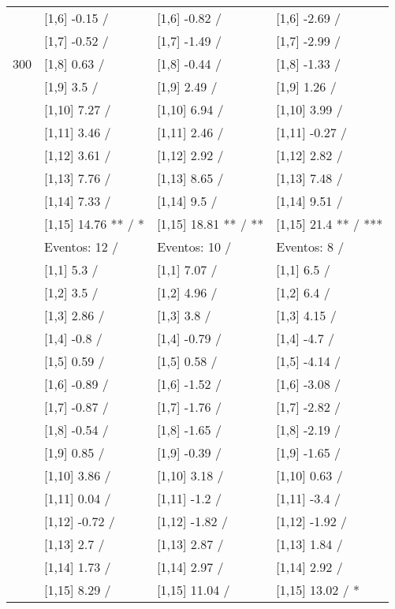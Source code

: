 \begin{table}
\begin{tabular}[t]{llll}
 & {}[1,6] -0.15  / & {}[1,6] -0.82  / & {}[1,6] -2.69  /\\
 & {}[1,7] -0.52  / & {}[1,7] -1.49  / & {}[1,7] -2.99  /\\
300 & {}[1,8] 0.63  / & {}[1,8] -0.44  / & {}[1,8] -1.33  /\\
\addlinespace
 & {}[1,9] 3.5  / & {}[1,9] 2.49  / & {}[1,9] 1.26  /\\
 & {}[1,10] 7.27  / & {}[1,10] 6.94  / & {}[1,10] 3.99  /\\
 & {}[1,11] 3.46  / & {}[1,11] 2.46  / & {}[1,11] -0.27  /\\
 & {}[1,12] 3.61  / & {}[1,12] 2.92  / & {}[1,12] 2.82  /\\
 & {}[1,13] 7.76  / & {}[1,13] 8.65  / & {}[1,13] 7.48  /\\
\addlinespace
 & {}[1,14] 7.33  / & {}[1,14] 9.5  / & {}[1,14] 9.51  /\\
 & {}[1,15] 14.76 ** / * & {}[1,15] 18.81 ** / ** & {}[1,15] 21.4 ** / ***\\
 & Eventos:  12 / & Eventos:  10 / & Eventos:  8 /\\
 & {}[1,1] 5.3  / & {}[1,1] 7.07  / & {}[1,1] 6.5  /\\
 & {}[1,2] 3.5  / & {}[1,2] 4.96  / & {}[1,2] 6.4  /\\
\addlinespace
 & {}[1,3] 2.86  / & {}[1,3] 3.8  / & {}[1,3] 4.15  /\\
 & {}[1,4] -0.8  / & {}[1,4] -0.79  / & {}[1,4] -4.7  /\\
 & {}[1,5] 0.59  / & {}[1,5] 0.58  / & {}[1,5] -4.14  /\\
 & {}[1,6] -0.89  / & {}[1,6] -1.52  / & {}[1,6] -3.08  /\\
 & {}[1,7] -0.87  / & {}[1,7] -1.76  / & {}[1,7] -2.82  /\\
\addlinespace
500 & {}[1,8] -0.54  / & {}[1,8] -1.65  / & {}[1,8] -2.19  /\\
 & {}[1,9] 0.85  / & {}[1,9] -0.39  / & {}[1,9] -1.65  /\\
 & {}[1,10] 3.86  / & {}[1,10] 3.18  / & {}[1,10] 0.63  /\\
 & {}[1,11] 0.04  / & {}[1,11] -1.2  / & {}[1,11] -3.4  /\\
 & {}[1,12] -0.72  / & {}[1,12] -1.82  / & {}[1,12] -1.92  /\\
\addlinespace
 & {}[1,13] 2.7  / & {}[1,13] 2.87  / & {}[1,13] 1.84  /\\
 & {}[1,14] 1.73  / & {}[1,14] 2.97  / & {}[1,14] 2.92  /\\
 & {}[1,15] 8.29  / & {}[1,15] 11.04  / & {}[1,15] 13.02  / *\\
\bottomrule
\end{tabular}
\end{table}
